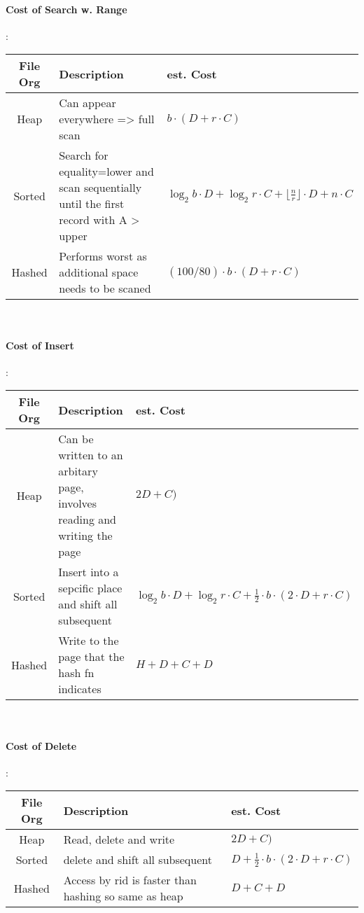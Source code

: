 \documentclass[a4paper]{article}
\begin{document}
\begin{twocolumn}
\paragraph{Cost of Search w. Range}: \\ 
\begin{tabular}{|c|p{3cm}|p{3cm}|} \hline
	File Org & Description & est. Cost \\ \hline
	Heap & Can appear everywhere => full scan & $b \cdot (D + r \cdot C)$ \\ \hline
	Sorted & Search for equality=lower and scan sequentially until the first record with A > upper & $ \log_2 b \cdot D + \log_2 r \cdot C + \lfloor \frac{n}{r} \rfloor \cdot D + n \cdot C$ \\ \hline
	Hashed & Performs worst as additional space needs to be scaned  & $ (100/80) \cdot b \cdot (D + r \cdot C)$ \\ \hline
\end{tabular} \\

\paragraph{Cost of Insert}:  \\ 
\begin{tabular}{|c|p{3cm}|p{3cm}|} \hline
	File Org & Description & est. Cost \\ \hline
	Heap & Can be written to an arbitary page, involves reading and writing the page & $2D + C)$ \\ \hline
	Sorted & Insert into a sepcific place and shift all subsequent  & $ \log_2 b \cdot D + \log_2 r \cdot C + \frac{1}{2} \cdot b \cdot (2 \cdot D + r \cdot C)$ \\ \hline
	Hashed & Write to the page that the hash fn indicates  & $ H+ D + C + D$ \\ \hline
\end{tabular} \\

\paragraph{Cost of Delete}:  \\ 
\begin{tabular}{|c|p{3cm}|p{3cm}|} \hline
	File Org & Description & est. Cost \\ \hline
	Heap & Read, delete and write & $2D + C)$ \\ \hline
	Sorted & delete and shift all subsequent  & $ D + \frac{1}{2} \cdot b \cdot (2 \cdot D + r \cdot C)$ \\ \hline
	Hashed & Access by rid is faster than hashing so same as heap & $  D + C + D$ \\ \hline
\end{tabular} \\





\end{twocolumn}
\end{document}
